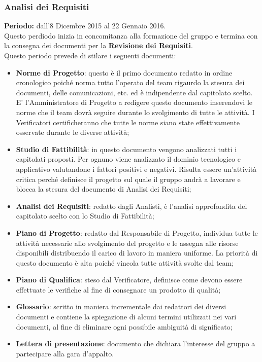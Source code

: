 \subsubsection{Analisi dei Requisiti}
\textbf{Periodo:} dall'8 Dicembre 2015 al 22 Gennaio 2016.\\
Questo perdiodo inizia in concomitanza alla formazione del gruppo e termina con la consegna dei documenti per la \textbf{Revisione dei Requisiti}.\\ 
Questo periodo prevede di stilare i seguenti documenti:
\begin{itemize}
		\item \textbf{Norme di Progetto}: questo è il primo documento redatto in ordine cronologico poiché norma tutto l'operato del team rigaurdo la stesura dei documenti, delle comunicazioni, etc. ed è indipendente dal capitolato scelto. E' l’Amministratore di Progetto a redigere questo documento inserendovi le norme che il team dovrà seguire durante lo svolgimento di tutte le attività. I Verificatori certificheranno che tutte le norme siano state effettivamente osservate durante le diverse attività;
		\item \textbf{Studio di Fattibilità}: in questo documento vengono analizzati tutti i capitolati proposti. Per ognuno viene analizzato il dominio tecnologico e applicativo valutandone i fattori positivi e negativi. Risulta essere un'attività	critica perché definisce il progetto sul quale il gruppo andrà a lavorare e blocca la stesura del documento di Analisi dei Requisiti;
		\item \textbf{Analisi dei Requisiti}: redatto dagli Analisti, è l'analisi approfondita del capitolato scelto con lo Studio di Fattibilità;
		\item \textbf{Piano di Progetto}: redatto dal Responsabile di Progetto, individua tutte le attività necessarie allo svolgimento del progetto e le assegna alle risorse disponibili distribuendo il carico di lavoro in maniera uniforme.
		La priorità di questo documento è alta poiché vincola tutte attività svolte dal team;
		\item \textbf{Piano di Qualifica}: steso dal Verificatore, definisce come devono essere effettuate le verifiche al fine di consegnare un prodotto di qualità;
		\item \textbf{Glossario}: scritto in maniera incrementale dai redattori dei diversi documenti e contiene la spiegazione di alcuni termini utilizzati nei vari documenti, al fine di eliminare ogni possibile ambiguità di significato;
		\item \textbf{Lettera di presentazione}: documento che dichiara l’interesse del gruppo a partecipare alla gara d’appalto.
\end{itemize}
